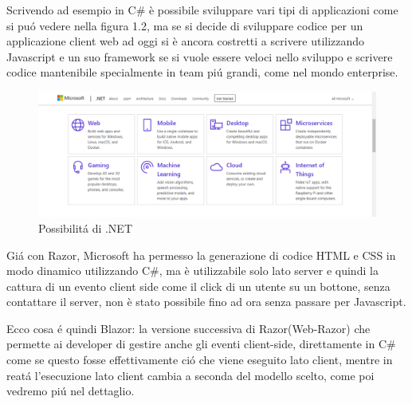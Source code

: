 Scrivendo ad esempio in C\# \`e possibile sviluppare vari tipi di applicazioni come si pu\'o vedere nella figura 1.2, ma se si decide di sviluppare codice per un applicazione client web ad oggi si \`e ancora costretti a scrivere utilizzando Javascript e un suo framework se si vuole essere veloci nello sviluppo e scrivere codice mantenibile specialmente in team pi\'u grandi, come nel mondo enterprise.

\begin{figure}[H]
\centerline{\includegraphics[scale=0.35]{figure/DotNetFrameworkCapabilities}}
\caption{Possibilit\'a di .NET}
\label{fig:DotNetCapabilities}
\end{figure}

Gi\'a con Razor\cite{razor}, Microsoft ha permesso la generazione di codice HTML e CSS in modo dinamico utilizzando C\#, ma \`e utilizzabile solo lato server e quindi la cattura di un evento client side come il click di un utente su un bottone, senza contattare il server, non \`e stato possibile fino ad ora senza passare per Javascript.

Ecco cosa \'e quindi Blazor: la versione successiva di Razor(Web-Razor) che permette ai developer di gestire anche gli eventi client-side, direttamente in C\# come se questo fosse effettivamente ci\'o che viene eseguito lato client, mentre in reat\'a l'esecuzione lato client cambia a seconda del modello scelto, come poi vedremo pi\'u nel dettaglio.